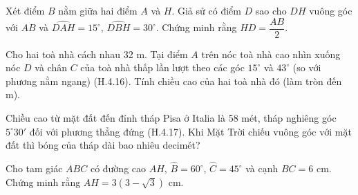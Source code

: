 \begin{practice}
\begin{questions}[resume=SBT]
        \item Xét điểm $B$ nằm giữa hai điểm $A$ và $H$. Giả sử có điểm $D$ sao cho $DH$ vuông góc với $AB$ và $\widehat{DAH}=15^\circ$, $\widehat{DBH}=30^\circ$. Chứng minh rằng $HD=\dfrac{AB}{2}$.

        \answerline
        \answerline
        \answerline

        \item Cho hai toà nhà cách nhau 32 m. Tại điểm $A$ trên nóc toà nhà cao nhìn xuống nóc $D$ và chân $C$ của toà nhà thấp lần lượt theo các góc $15^\circ$ và $43^\circ$ (so với phương nằm ngang) (H.4.16). Tính chiều cao của hai toà nhà đó (làm tròn đến m).

        \begin{center}
        \end{center}

        \answerline
        \answerline
        \answerline

        \item Chiều cao từ mặt đất đến đỉnh tháp Pisa ở Italia là 58 mét, tháp nghiêng góc $5^\circ30'$ đối với phương thẳng đứng (H.4.17). Khi Mặt Trời chiếu vuông góc với mặt đất thì bóng của tháp dài bao nhiêu decimét?

        \answerline
        \answerline

        \item Cho tam giác $ABC$ có đường cao $AH$, $\widehat{B}=60^\circ$, $\widehat{C}=45^\circ$ và cạnh $BC=6$ cm. Chứng minh rằng $AH=3(3-\sqrt{3})$ cm.


\end{questions}
\end{practice}
